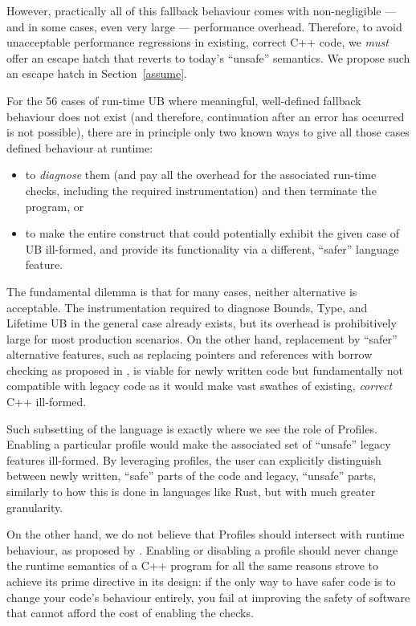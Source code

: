 However, practically all of this fallback behaviour comes with non-negligible --- and in some cases, even very large --- performance overhead. Therefore, to avoid unacceptable performance regressions in existing, correct C++ code, we \emph{must} offer an escape hatch that reverts to today's ``unsafe'' semantics. We propose such an escape hatch in Section~\ref{assume}.

For the 56 cases of run-time UB where meaningful, well-defined fallback behaviour does not exist (and therefore, continuation after an error has occurred is not possible), there are in principle only two known ways to give all those cases defined behaviour at runtime:
\begin{itemize}
\item to \emph{diagnose} them (and pay all the overhead for the associated run-time checks, including the required instrumentation) and then terminate the program, or
\item to make the entire construct that could potentially exhibit the given case of UB ill-formed, and provide its functionality via a different, ``safer'' language feature.
\end{itemize}

The fundamental dilemma is that for many cases, neither alternative is acceptable. The instrumentation required to diagnose Bounds, Type, and Lifetime UB in the general case already exists, but its overhead is prohibitively large for most production scenarios. On the other hand, replacement by ``safer'' alternative features, such as replacing pointers and references with borrow checking as proposed in \cite{P3390R0}, is viable for newly written code but fundamentally not compatible with legacy code as it would make vast swathes of existing, \emph{correct} C++ ill-formed.

Such subsetting of the language is exactly where we see the role of Profiles. Enabling a particular profile would make the associated set of ``unsafe'' legacy features ill-formed. By leveraging profiles, the user can explicitly distinguish between newly written, ``safe'' parts of the code and legacy, ``unsafe'' parts, similarly to how this is done in languages like Rust, but with much greater granularity.

On the other hand, we do not believe that Profiles should intersect with runtime behaviour, as proposed by  \cite{P3081R1}. Enabling or disabling a profile should never change the runtime semantics of a C++ program for all the same reasons \cite{P2900R14} strove to achieve its prime directive in its design: if the only way to have safer code is to change your code's behaviour entirely, you fail at improving the safety of software that cannot afford the cost of enabling the checks.

